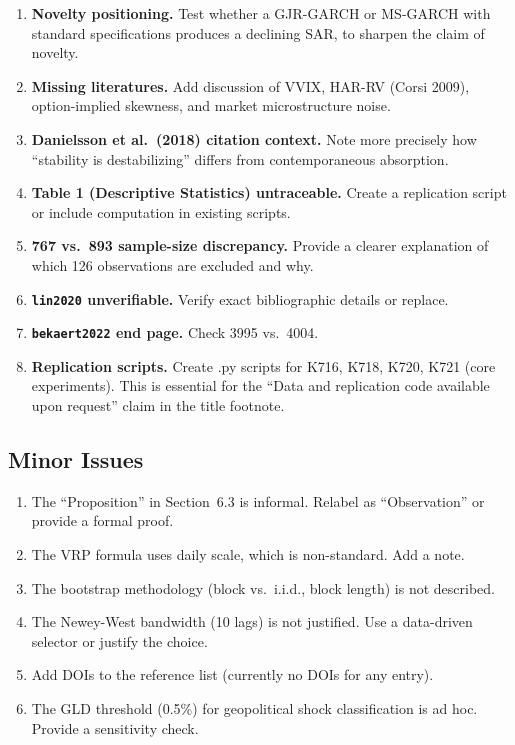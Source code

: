 \documentclass[12pt,a4paper]{article}
\begin{document}
\begin{enumerate}[label=\textbf{M\arabic*.}, leftmargin=2em]
  \item \textbf{Novelty positioning.}  Test whether a GJR-GARCH or MS-GARCH with standard specifications produces a declining SAR, to sharpen the claim of novelty.

  \item \textbf{Missing literatures.}  Add discussion of VVIX, HAR-RV (Corsi 2009), option-implied skewness, and market microstructure noise.

  \item \textbf{Danielsson et al.\ (2018) citation context.}  Note more precisely how ``stability is destabilizing'' differs from contemporaneous absorption.

  \item \textbf{Table 1 (Descriptive Statistics) untraceable.}  Create a replication script or include computation in existing scripts.

  \item \textbf{767 vs.\ 893 sample-size discrepancy.}  Provide a clearer explanation of which 126 observations are excluded and why.

  \item \textbf{\texttt{lin2020} unverifiable.}  Verify exact bibliographic details or replace.

  \item \textbf{\texttt{bekaert2022} end page.}  Check 3995 vs.\ 4004.

  \item \textbf{Replication scripts.}  Create .py scripts for K716, K718, K720, K721 (core experiments).  This is essential for the ``Data and replication code available upon request'' claim in the title footnote.
\end{enumerate}

\subsection*{Minor Issues}

\begin{enumerate}[label=\textbf{m\arabic*.}, leftmargin=2em]
  \item The ``Proposition'' in Section~6.3 is informal.  Relabel as ``Observation'' or provide a formal proof.

  \item The VRP formula uses daily scale, which is non-standard.  Add a note.

  \item The bootstrap methodology (block vs.\ i.i.d., block length) is not described.

  \item The Newey-West bandwidth (10 lags) is not justified.  Use a data-driven selector or justify the choice.

  \item Add DOIs to the reference list (currently no DOIs for any entry).

  \item The GLD threshold (0.5\%) for geopolitical shock classification is ad hoc.  Provide a sensitivity check.
\end{enumerate}
\end{document}
